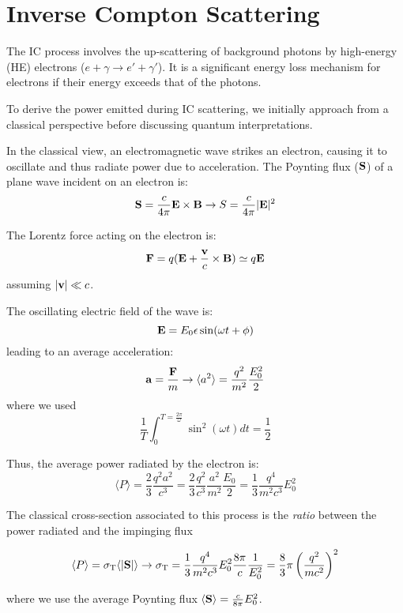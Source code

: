 \section{Inverse Compton Scattering}

The IC process involves the up-scattering of background photons by high-energy (HE) electrons (\(e + \gamma \rightarrow e' + \gamma'\)). It is a significant energy loss mechanism for electrons if their energy exceeds that of the photons.

To derive the power emitted during IC scattering, we initially approach from a classical perspective before discussing quantum interpretations.

In the classical view, an electromagnetic wave strikes an electron, causing it to oscillate and thus radiate power due to acceleration. The Poynting flux (\( \vb S \)) of a plane wave incident on an electron is:
%
\[
\vb S =  \frac{c}{4\pi} \vb E \times \vb B \rightarrow S = \frac{c}{4\pi} | \vb E |^2   
\]

The Lorentz force acting on the electron is:
%
\[
\vb F = q (\vb E + \frac{\vb v}{c} \times \vb B) \simeq q \vb E
\]
%
assuming \( | \vb v | \ll c \).

The oscillating electric field of the wave is:
%
\[
\vb E = E_0 \vb \epsilon \sin (\omega t + \phi)
\]
%
leading to an average acceleration:
%
\[
\vb a = \frac{\vb F}{m} \rightarrow \langle a^2 \rangle = \frac{q^2}{m^2} \frac{E_0^2}{2}
\]
%
where we used
%
\[
\frac{1}{T} \int_0^{T = \frac{2\pi}{\omega}} \sin^2 (\omega t) dt = \frac{1}{2}
\]

Thus, the average power radiated by the electron is:
%
\[
\langle P \rangle = \frac{2}{3} \frac{q^2 a^2}{c^3} = \frac{2}{3} \frac{q^2}{c^3} \frac{a^2}{m^2} \frac{E_0}{2} = \frac{1}{3} \frac{q^4}{m^2 c^3} E_0^2
\]

The classical cross-section associated to this process is the \emph{ratio} between the power radiated and the impinging flux
%
\begin{remark}
\begin{equation*}
\langle P \rangle = \sigma_{\rm T} \langle | \vb S | \rangle \rightarrow \sigma_{\rm T} = \frac{1}{3} \frac{q^4}{m^2 c^3} E_0^2 \frac{8\pi}{c} \frac{1}{E_0^2} = \frac{8}{3} \pi \left( \frac{q^2}{m c^2} \right)^2
\end{equation*}
\end{remark}
%
where we use the average Poynting flux $\langle \vb S \rangle = \frac{c}{8\pi} E_0^2$.


